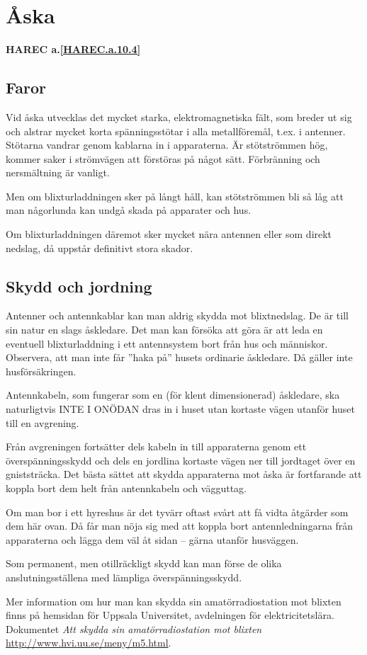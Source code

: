 \section{Åska}
\textbf{
HAREC a.\ref{HAREC.a.10.4}\label{myHAREC.a.10.4}
}

\subsection{Faror}

Vid åska utvecklas det mycket starka, elektromagnetiska fält, som
breder ut sig och alstrar mycket korta spänningsstötar i alla
metallföremål, t.ex. i antenner. Stötarna vandrar genom kablarna in i
apparaterna. Är stötströmmen hög, kommer saker i strömvägen att förstöras
på något sätt. Förbränning och nersmältning är vanligt.

Men om blixturladdningen sker på långt håll, kan stötströmmen bli så låg att
man någorlunda kan undgå skada på apparater och hus.

Om blixturladdningen däremot sker mycket nära antennen eller som direkt nedslag,
då uppstår definitivt stora skador.

\subsection{Skydd och jordning}

Antenner och antennkablar kan man aldrig skydda mot blixtnedslag. De är
till sin natur en slags åskledare. Det man kan försöka att göra är
att leda en eventuell blixturladdning i ett antennsystem bort från hus
och människor. Observera, att man inte får ''haka på'' husets
ordinarie åskledare. Då gäller inte husförsäkringen.

Antennkabeln, som fungerar som en (för klent dimensionerad) åskledare,
ska naturligtvis INTE I ONÖDAN dras in i huset utan kortaste vägen
utanför huset till en avgrening.

Från avgreningen fortsätter dels kabeln in till apparaterna genom ett
överspänningsskydd och dels en jordlina kortaste vägen ner till
jordtaget över en gniststräcka. Det bästa sättet att skydda
apparaterna mot åska är fortfarande att koppla bort dem helt från
antennkabeln och vägguttag.

Om man bor i ett hyreshus är det tyvärr oftast svårt att få vidta
åtgärder som dem här ovan. Då får man nöja sig med att koppla
bort antennledningarna från apparaterna och lägga dem väl åt sidan --
gärna utanför husväggen.

Som permanent, men otillräckligt skydd kan man förse de olika
anslutningsställena med lämpliga överspänningsskydd.

Mer information om hur man kan skydda sin amatörradiostation mot blixten
finns på hemsidan för Uppsala Universitet, avdelningen för elektricitetslära.
Dokumentet \emph{Att skydda sin amatörradiostation mot blixten}
\url{http://www.hvi.uu.se/meny/m5.html}.
